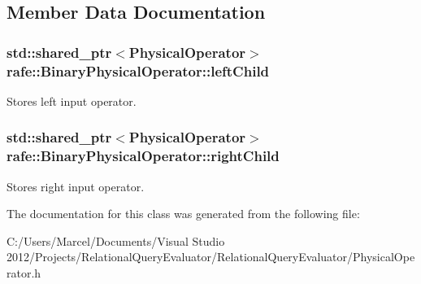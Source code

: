 \subsection{Member Data Documentation}
\hypertarget{classrafe_1_1_binary_physical_operator_a3ca06613d63ed240f6306f0fb36a5d26}{
\subsubsection[{left\+Child}]{\setlength{\rightskip}{0pt plus 5cm}std\+::shared\+\_\+ptr$<${\bf Physical\+Operator}$>$ rafe\+::\+Binary\+Physical\+Operator\+::left\+Child}}\label{classrafe_1_1_binary_physical_operator_a3ca06613d63ed240f6306f0fb36a5d26}
Stores left input operator. \hypertarget{classrafe_1_1_binary_physical_operator_a0c90c9b14fd1e543cf721cdb54f658fd}{
\subsubsection[{right\+Child}]{\setlength{\rightskip}{0pt plus 5cm}std\+::shared\+\_\+ptr$<${\bf Physical\+Operator}$>$ rafe\+::\+Binary\+Physical\+Operator\+::right\+Child}}\label{classrafe_1_1_binary_physical_operator_a0c90c9b14fd1e543cf721cdb54f658fd}
Stores right input operator. 

The documentation for this class was generated from the following file\+:\begin{DoxyCompactItemize}
\item 
C\+:/\+Users/\+Marcel/\+Documents/\+Visual Studio 2012/\+Projects/\+Relational\+Query\+Evaluator/\+Relational\+Query\+Evaluator/Physical\+Operator.\+h\end{DoxyCompactItemize}
